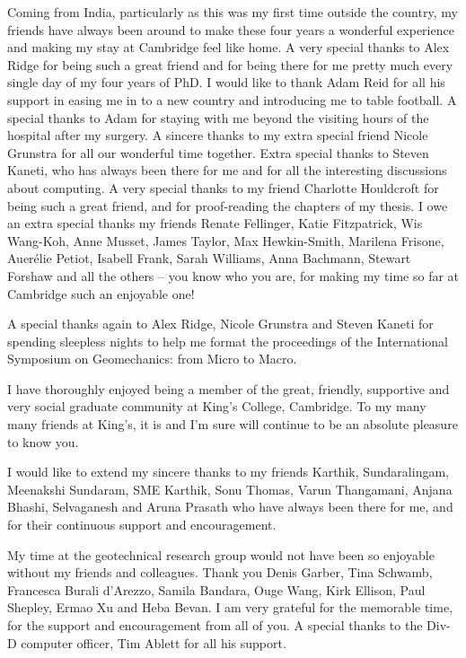 \begin{acknowledgements}
Coming from India, particularly as this was my first time outside the country, 
my friends have always been around to make these four years a wonderful 
experience and making my stay at Cambridge feel like home. A very special 
thanks to Alex Ridge for being such a great friend 
and for being there for me pretty much every single day of my four years of 
PhD. I would like to thank Adam Reid for all his support in easing me in to a 
new country and introducing me to table football. A special thanks to Adam for 
staying with me beyond the visiting hours of the hospital after my surgery. A 
sincere thanks to my extra special friend Nicole Grunstra for all our 
wonderful time together. Extra special thanks to Steven Kaneti, who has always 
been there for me and for all the interesting discussions about computing. A 
very special thanks to my friend Charlotte Houldcroft for being such a great 
friend, and for proof-reading the chapters of my thesis. I owe 
an extra special 
thanks my friends Renate Fellinger, Katie Fitzpatrick, Wis Wang-Koh, Anne 
Musset, James Taylor, Max Hewkin-Smith, Marilena Frisone, Auer\'{e}lie Petiot, 
Isabell Frank, Sarah Williams, Anna Bachmann, Stewart Forshaw and all the 
others -- you know who you are, for making my time so far at Cambridge such an 
enjoyable one!

A special thanks again to Alex Ridge, Nicole Grunstra and Steven Kaneti for 
spending sleepless nights to help me format the proceedings of the 
International Symposium on Geomechanics: from Micro to Macro.

I have thoroughly enjoyed being a member of the great, friendly, supportive and 
very social graduate community at King's College, Cambridge. To my many many 
friends at King's, it is and I'm sure will continue to be an absolute pleasure 
to know you. %

I would like to extend my sincere thanks to my friends Karthik, Sundaralingam, 
Meenakshi Sundaram, SME Karthik, Sonu Thomas, Varun Thangamani, Anjana Bhashi,  
Selvaganesh and Aruna Prasath who have always been there for me, and for their 
continuous support and encouragement. 

My time at the geotechnical research group would not have been so enjoyable 
without my friends and colleagues. Thank you Denis Garber, Tina Schwamb, 
Francesca Burali d'Arezzo, Samila Bandara, Ouge Wang, Kirk Ellison, Paul 
Shepley, Ermao Xu and Heba Bevan. I am very grateful for the memorable time, 
for the support and encouragement from all of you. A special thanks to the 
Div-D computer officer, Tim Ablett for all his support.


\end{acknowledgements}

